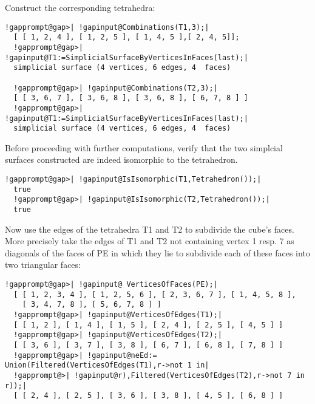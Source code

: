 \documentclass[a4paper,11pt]{report}
\begin{document}
{{{ Construct the corresponding tetrahedra: 

 
\begin{Verbatim}[commandchars=!@|,fontsize=\small,frame=single,label=Example]
  !gapprompt@gap>| !gapinput@Combinations(T1,3);|
  [ [ 1, 2, 4 ], [ 1, 2, 5 ], [ 1, 4, 5 ],[ 2, 4, 5]];
  !gapprompt@gap>| !gapinput@T1:=SimplicialSurfaceByVerticesInFaces(last);|
  simplicial surface (4 vertices, 6 edges, 4  faces)                
  
  !gapprompt@gap>| !gapinput@Combinations(T2,3);|
  [ [ 3, 6, 7 ], [ 3, 6, 8 ], [ 3, 6, 8 ], [ 6, 7, 8 ] ]
  !gapprompt@gap>| !gapinput@T1:=SimplicialSurfaceByVerticesInFaces(last);|
  simplicial surface (4 vertices, 6 edges, 4  faces) 
\end{Verbatim}
 

 
\begin{center}

\end{center}
 

 Before proceeding with further computations, verify that the two simplcial
surfaces constructed are indeed isomorphic to the tetrahedron. 

 
\begin{Verbatim}[commandchars=!@|,fontsize=\small,frame=single,label=Example]
  !gapprompt@gap>| !gapinput@IsIsomorphic(T1,Tetrahedron());|
  true
  !gapprompt@gap>| !gapinput@IsIsomorphic(T2,Tetrahedron());|
  true
\end{Verbatim}
 

 Now use the edges of the tetrahedra T1 and T2 to subdivide the cube's faces.
More precisely take the edges of T1 and T2 not containing vertex 1 resp. 7 as
diagonals of the faces of PE in which they lie to subdivide each of these
faces into two triangular faces: 

 
\begin{Verbatim}[commandchars=!@|,fontsize=\small,frame=single,label=Example]
  !gapprompt@gap>| !gapinput@ VerticesOfFaces(PE);|
  [ [ 1, 2, 3, 4 ], [ 1, 2, 5, 6 ], [ 2, 3, 6, 7 ], [ 1, 4, 5, 8 ], 
    [ 3, 4, 7, 8 ], [ 5, 6, 7, 8 ] ]
  !gapprompt@gap>| !gapinput@VerticesOfEdges(T1);|
  [ [ 1, 2 ], [ 1, 4 ], [ 1, 5 ], [ 2, 4 ], [ 2, 5 ], [ 4, 5 ] ]
  !gapprompt@gap>| !gapinput@VerticesOfEdges(T2);|
  [ [ 3, 6 ], [ 3, 7 ], [ 3, 8 ], [ 6, 7 ], [ 6, 8 ], [ 7, 8 ] ]
  !gapprompt@gap>| !gapinput@neEd:= Union(Filtered(VerticesOfEdges(T1),r->not 1 in|
  !gapprompt@>| !gapinput@r),Filtered(VerticesOfEdges(T2),r->not 7 in r));|
  [ [ 2, 4 ], [ 2, 5 ], [ 3, 6 ], [ 3, 8 ], [ 4, 5 ], [ 6, 8 ] ]
  

\end{Verbatim}}}}
\end{document}

